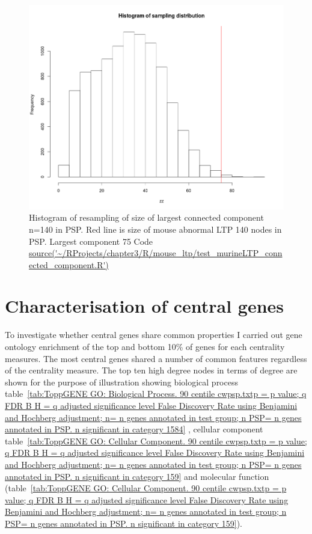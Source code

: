 \begin{figure}
    \centering
    \includegraphics[width=\textwidth]{images/chapter3/connected_components/Rplot_mouse_abnormal_ltp_histogram_MP0002207.png}
    \caption{Histogram of resampling of size of largest connected component n=140 in PSP. Red line is size of mouse abnormal LTP 140 nodes in PSP. Largest component 75 Code\url{ source('~/RProjects/chapter3/R/mouse_ltp/test_murineLTP_connected_component.R')}}
    \label{fig:histogram mouse ltp}
\end{figure}
 
 \clearpage
 
 

\section{Characterisation of central genes}

To investigate whether central genes share common properties I carried out gene ontology enrichment of the top and bottom 10\% of genes for each centrality measures. The most central genes shared a number of common features regardless of the centrality measure. The top ten high degree nodes in terms of degree are shown for the purpose of illustration showing biological process table~\ref{tab:ToppGENE GO: Biological Process. 90 centile cwpsp.txtp = p value; q FDR B H = q adjusted significance level False Discovery Rate using Benjamini and Hochberg adjustment; n= n genes annotated in test group; n PSP= n genes annotated in PSP. n significant in category 1584} , cellular component table~\ref{tab:ToppGENE GO: Cellular Component. 90 centile cwpsp.txtp = p value; q FDR B H = q adjusted significance level False Discovery Rate using Benjamini and Hochberg adjustment; n= n genes annotated in test group; n PSP= n genes annotated in PSP. n significant in category 159} and molecular function (table~\ref{tab:ToppGENE GO: Cellular Component. 90 centile cwpsp.txtp = p value; q FDR B H = q adjusted significance level False Discovery Rate using Benjamini and Hochberg adjustment; n= n genes annotated in test group; n PSP= n genes annotated in PSP. n significant in category 159}). 

